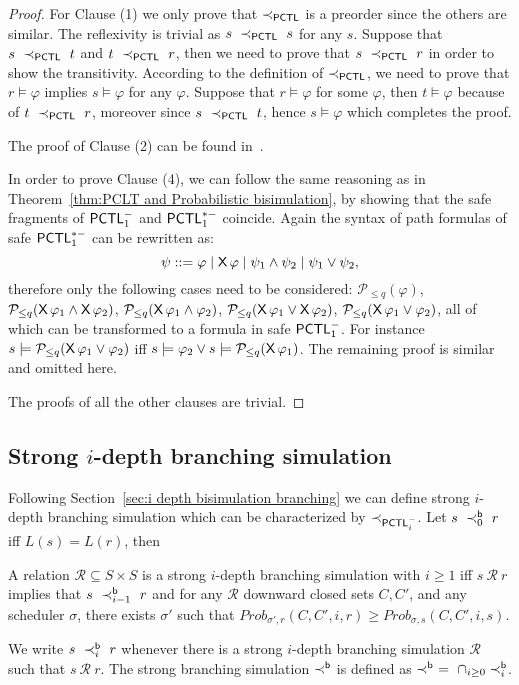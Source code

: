 \documentclass{LMCS}
\def\phi{\varphi}
\DeclareMathOperator{\X}{\text{\sf X}}
\newcommand{\PCTL}{{\sf PCTL}}
\newcommand{\iBSi}[1]{\prec_{#1}^{{\sf b}}}
\newcommand{\SEPCTL}{\prec_{\PCTL}}
\newcommand{\iSEPCTLM}[1]{\prec_{\PCTL^{-}_{#1}}}
\newcommand{\MC}[1]{\mathcal{#1}}
\newcommand{\MEASURE}{\mathit{Prob}}
\begin{document}
\begin{proof}
For Clause (1) we only prove that $\SEPCTL$ is a preorder since the others are similar. The reflexivity is trivial as $s~\SEPCTL~s$ for any $s$. Suppose that $s~\SEPCTL~t$ and $t~\SEPCTL~r$, then we need to prove that $s~\SEPCTL~r$ in order to show the transitivity. According to the definition of $\SEPCTL$, we need to prove that $r\models\phi$ implies $s\models\phi$ for any $\phi$. Suppose that $r\models\phi$ for some $\phi$, then $t\models\phi$ because of $t~\SEPCTL~r$, moreover since $s~\SEPCTL~t$, hence $s\models\phi$ which completes the proof.

The proof of Clause (2) can be found in~\cite{SegalaL95}. 

In order to prove Clause (4), we can follow
the same reasoning as in Theorem~\ref{thm:PCLT and Probabilistic bisimulation},
by showing that the safe fragments of $\PCTL^{-}_{1}$ and $\PCTL^{*-}_{1}$  coincide. Again the syntax of path formulas of safe $\PCTL^{*-}_{1}$
can be rewritten as:
$$\psi ::= \phi \mid \X\phi\mid\psi_1\land\psi_2\mid\psi_1\lor\psi_2,$$
therefore only the following cases need to be considered:
$\MC{P}_{\le q}(\phi)$, $\MC{P}_{\le q}(\X\phi_1\land\X\phi_2)$, 
$\MC{P}_{\le q}(\X\phi_1\land\phi_2)$, $\MC{P}_{\le q}(\X\phi_1\lor\X\phi_2)$,
$\MC{P}_{\le q}(\X\phi_1\lor\phi_2)$, all of which can be transformed to a formula
in safe $\PCTL^{-}_1$. For instance $s\models\MC{P}_{\le q}(\X\phi_1\lor\phi_2)$
iff $s\models\phi_2\lor s\models\MC{P}_{\le q}(\X\phi_1)$. The remaining proof
is similar and omitted here.


The proofs of all the other clauses are trivial.
\end{proof}


\subsection{Strong \texorpdfstring{$i$}{i}-depth branching simulation}\label{sec:strong i brancing simulation}
Following Section~\ref{sec:i depth bisimulation branching} we can define strong $i$-depth branching simulation which can be characterized by $\iSEPCTLM{i}$. Let $s~\iBSi{0}~r$ iff $L(s)=L(r)$, then
\begin{defi}\label{def:index strong branching simulation}
A relation $\MC{R}\subseteq S\times S$ is a
strong $i$-depth branching simulation with $i\geq1$ iff $s~\MC{R}~r$ implies that $s~\iBSi{i-1}~r$ and for any $\MC{R}$ downward closed sets $C, C'$, and any scheduler $\sigma$, there exists $\sigma'$ such that $\MEASURE_{\sigma',r}(C,C',i,r)\geq\MEASURE_{\sigma,s}(C,C',i,s)$.

We write $s~\iBSi{i}~r$ whenever there is a strong $i$-depth branching simulation $\MC{R}$ such that $s~\MC{R}~r$. The strong branching simulation $\iBSi{}$ is defined as $\iBSi{}\ =\ \cap_{i\geq 0} \iBSi{i}$.
\end{defi}
\end{document}
